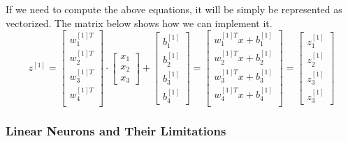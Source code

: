 If we need to compute the above equations, it will be simply be represented as vectorized. The matrix below shows how we can implement it.%
\[
z^{[1]} = 
\left[
 \begin{array}{ccc}
   w^{[1]T}_{1} \\
   w^{[1]T}_{2} \\
   w^{[1]T}_{3} \\
   w^{[1]T}_{4} \\ 
 \end{array}
\right]\cdot
\left[
 \begin{array}{c}
  x_{1} \\
  x_{2} \\
  x_{3} %
 \end{array}
\right] +
\left[
 \begin{array}{c}
  b_{1}^{[1]}\\
  b_{2}^{[1]}\\
  b_{3}^{[1]}\\
  b_{4}^{[1]}
 \end{array}
\right] =
\left[
 \begin{array}{cccc}
   w^{[1]T}_{1} x + b _1^{[1]}\\
   w^{[1]T}_{2} x + b _2^{[1] }\\
   w^{[1]T}_{3} x + b _3^{[1] }\\
   w^{[1]T}_{4} x + b _4^{[1] }\\ 
 \end{array}
\right] =
\left[
 \begin{array}{c}
  z_1^{[1]} \\
  z_2^{[1]} \\
  z_3^{[1]} \\
  z_3^{[1]}
 \end{array}
\right]
\]%
\subsubsection{Linear Neurons and Their Limitations}

